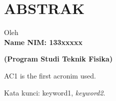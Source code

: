\clearpage
\chapter*{ABSTRAK}

\begin{center}
	\begin{singlespace}
		\large\bfseries\MakeUppercase{\thetitle}
		
		\normalfont\normalsize
		
		Oleh\\
		\bfseries{Name \hspace{5mm} NIM: 133xxxxx}
		
		\vspace{5mm}
		\large\bfseries{(Program Studi Teknik Fisika)}
		\vspace{5mm}
		
	\end{singlespace}
\end{center}

\begin{singlespace}
	\small
	\acf{AC1} is the first acronim used. \lipsum[1]
	
	Kata kunci: keyword1, \textit{keyword2}.
\end{singlespace}
\clearpage
